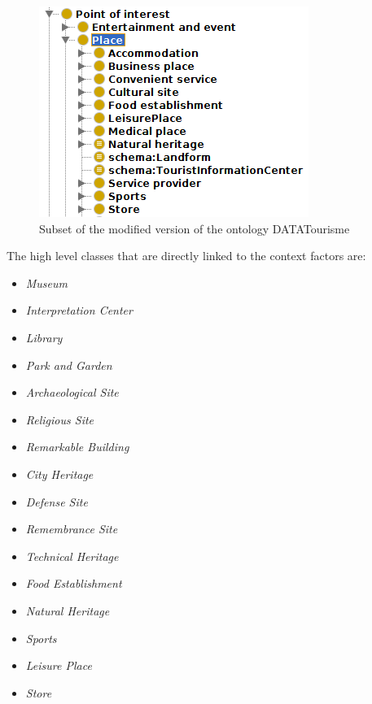 \begin{figure}[h]
\centering
\includegraphics[scale=0.5]{ontology.png}
\caption{Subset of the modified version of the ontology DATATourisme
}
\label{fig:ontology}
\end{figure}

The high level classes that are directly linked to the context factors are:
\begin{itemize}
    \item \textit{Museum}
    \item \textit{Interpretation Center}
    \item \textit{Library}
    \item \textit{Park and Garden}
    \item \textit{Archaeological Site}
    \item \textit{Religious Site}
    \item \textit{Remarkable Building}
    \item \textit{City Heritage}
    \item \textit{Defense Site}
    \item \textit{Remembrance Site}
    \item \textit{Technical Heritage}
    \item \textit{Food Establishment}
    \item \textit{Natural Heritage}
    \item \textit{Sports}
    \item \textit{Leisure Place}
    \item \textit{Store}
\end{itemize}

